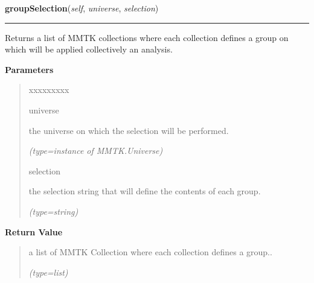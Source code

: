     \label{nMOLDYN:Analysis:Analysis:Analysis:groupSelection}

    \vspace{0.5ex}

\hspace{.8\funcindent}\begin{boxedminipage}{\funcwidth}

    \raggedright \textbf{groupSelection}(\textit{self}, \textit{universe}, \textit{selection})

    \vspace{-1.5ex}

    \rule{\textwidth}{0.5\fboxrule}
\setlength{\parskip}{2ex}
    Returns a list of MMTK collections where each collection defines a 
    group on which will be applied collectively an analysis.

\setlength{\parskip}{1ex}
      \textbf{Parameters}
      \vspace{-1ex}

      \begin{quote}
        \begin{Ventry}{xxxxxxxxx}

          \item[universe]

          the universe on which the selection will be performed.

            {\it (type=instance of MMTK.Universe)}

          \item[selection]

          the selection string that will define the contents of each group.

            {\it (type=string)}

        \end{Ventry}

      \end{quote}

      \textbf{Return Value}
    \vspace{-1ex}

      \begin{quote}
      a list of MMTK Collection where each collection defines a group..

      {\it (type=list)}

      \end{quote}

    \end{boxedminipage}

